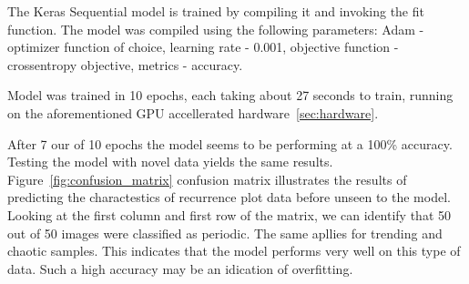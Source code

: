 \documentclass[a4paper,12pt,fleqn]{article}
\begin{document}
The Keras Sequential model is trained by compiling it and invoking the fit function.
The model was compiled using the following parameters: Adam - optimizer function of choice, learning rate - 0.001, objective function - crossentropy objective, metrics - accuracy.

Model was trained in 10 epochs, each taking about 27 seconds to train, running on the aforementioned GPU accellerated hardware~\ref{sec:hardware}.

After 7 our of 10 epochs the model seems to be performing at a 100\% accuracy.
Testing the model with novel data yields the same results.
Figure~\ref{fig:confusion_matrix} confusion matrix illustrates the results of predicting the charactestics of recurrence plot data before unseen to the model. Looking at the first column and first row of the matrix, we can identify that 50 out of 50 images were classified as periodic. The same apllies for trending and chaotic samples. This indicates that the model performs very well on this type of data. Such a high accuracy may be an idication of overfitting.











\end{document}
